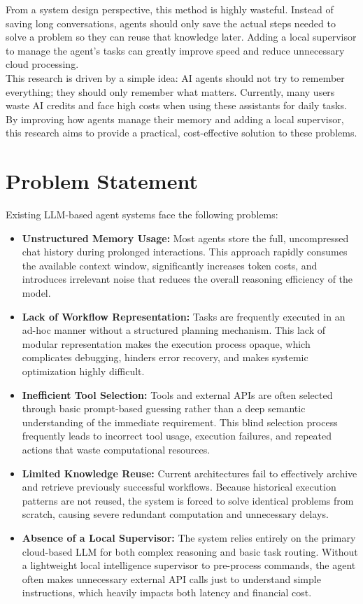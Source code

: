 From a system design perspective, this method is highly wasteful. Instead of saving long conversations, agents should only save the actual steps needed to solve a problem so they can reuse that knowledge later. Adding a local supervisor to manage the agent's tasks can greatly improve speed and reduce unnecessary cloud processing.\\

This research is driven by a simple idea: AI agents should not try to remember everything; they should only remember what matters. Currently, many users waste AI credits and face high costs when using these assistants for daily tasks. By improving how agents manage their memory and adding a local supervisor, this research aims to provide a practical, cost-effective solution to these problems.\\

\section{Problem Statement}
Existing LLM-based agent systems face the following problems:\\
\begin{itemize}
\item \textbf{Unstructured Memory Usage:} Most agents store the full, uncompressed chat history during prolonged interactions. This approach rapidly consumes the available context window, significantly increases token costs, and introduces irrelevant noise that reduces the overall reasoning efficiency of the model\cite{ai_agent-memory}.
\item \textbf{Lack of Workflow Representation:} Tasks are frequently executed in an ad-hoc manner without a structured planning mechanism. This lack of modular representation makes the execution process opaque, which complicates debugging, hinders error recovery, and makes systemic optimization highly difficult.
\item \textbf{Inefficient Tool Selection:} Tools and external APIs are often selected through basic prompt-based guessing rather than a deep semantic understanding of the immediate requirement\cite{efficient_tool_select}. This blind selection process frequently leads to incorrect tool usage, execution failures, and repeated actions that waste computational resources.
\item \textbf{Limited Knowledge Reuse:} Current architectures fail to effectively archive and retrieve previously successful workflows. Because historical execution patterns are not reused, the system is forced to solve identical problems from scratch, causing severe redundant computation and unnecessary delays.
\item \textbf{Absence of a Local Supervisor:} The system relies entirely on the primary cloud-based LLM for both complex reasoning and basic task routing. Without a lightweight local intelligence supervisor to pre-process commands, the agent often makes unnecessary external API calls just to understand simple instructions, which heavily impacts both latency and financial cost.
\end{itemize}

